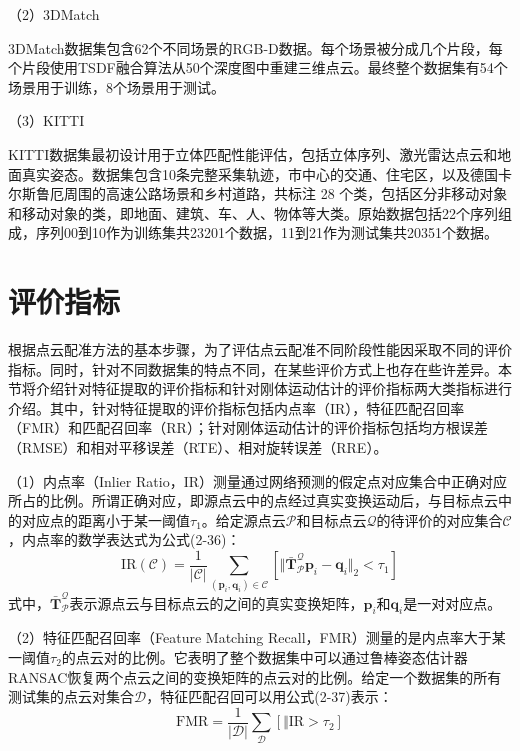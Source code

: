 （2）3DMatch\par
3DMatch数据集包含62个不同场景的RGB-D数据。每个场景被分成几个片段，每个片段使用TSDF融合算法从50个深度图中重建三维点云。最终整个数据集有54个场景用于训练，8个场景用于测试。

（3）KITTI\par
KITTI数据集最初设计用于立体匹配性能评估，包括立体序列、激光雷达点云和地面真实姿态。数据集包含10条完整采集轨迹，市中心的交通、住宅区，以及德国卡尔斯鲁厄周围的高速公路场景和乡村道路，共标注 28 个类，包括区分非移动对象和移动对象的类，即地面、建筑、车、人、物体等大类。原始数据包括22个序列组成，序列00到10作为训练集共23201个数据，11到21作为测试集共20351个数据。

\section{评价指标}
根据点云配准方法的基本步骤，为了评估点云配准不同阶段性能因采取不同的评价指标。同时，针对不同数据集的特点不同，在某些评价方式上也存在些许差异。本节将介绍针对特征提取的评价指标和针对刚体运动估计的评价指标两大类指标进行介绍。其中，针对特征提取的评价指标包括内点率（IR），特征匹配召回率（FMR）和匹配召回率（RR）；针对刚体运动估计的评价指标包括均方根误差（RMSE）和相对平移误差（RTE）、相对旋转误差（RRE）。

（1）内点率（Inlier Ratio，IR）测量通过网络预测的假定点对应集合中正确对应所占的比例。所谓正确对应，即源点云中的点经过真实变换运动后，与目标点云中的对应点的距离小于某一阈值$\tau_1$。给定源点云$\mathcal{P}$和目标点云$\mathcal{Q}$的待评价的对应集合$\mathcal{C}$，内点率的数学表达式为公式(2-36)：
\begin{equation}
    \mathrm{IR}(\mathcal{C}) = \frac{1}{ |\mathcal{C}|} \sum_{(\mathbf{p}_i,\mathbf{q}_i)\in  \mathcal{C}} [\Vert  \mathbf{\bar{T}}_\mathcal{P}^\mathcal{Q}\mathbf{p}_i -\mathbf{q}_i \Vert_2 < \tau_1]
\end{equation}
式中，$\mathbf{\bar{T}}_\mathcal{P}^\mathcal{Q}$表示源点云与目标点云的之间的真实变换矩阵，$\mathbf{p}_i$和$\mathbf{q}_i$是一对对应点。

（2）特征匹配召回率（Feature Matching Recall，FMR）测量的是内点率大于某一阈值$\tau_2$的点云对的比例。它表明了整个数据集中可以通过鲁棒姿态估计器RANSAC恢复两个点云之间的变换矩阵的点云对的比例。给定一个数据集的所有测试集的点云对集合$\mathcal{D}$，特征匹配召回可以用公式(2-37)表示：
\begin{equation}
    \mathrm{FMR} = \frac{1}{|\mathcal{D}|} \sum_{\mathcal{D}} [\Vert  \mathrm{IR}> \tau_2]
\end{equation}

